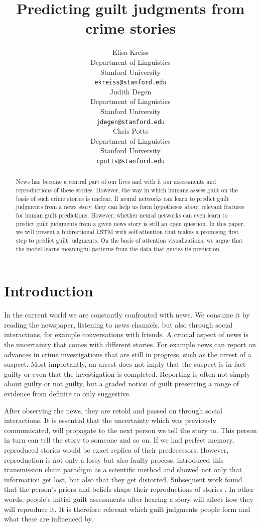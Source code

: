 \documentclass[11pt,a4paper]{article}
\title{Predicting guilt judgments from crime stories}
\author{Elisa Kreiss \\
  Department of Linguistics \\
  Stanford University \\
  \texttt{ekreiss@stanford.edu} \\\And
  Judith Degen \\
  Department of Linguistics \\
  Stanford University \\
  \texttt{jdegen@stanford.edu} \\\And
  Chris Potts \\
  Department of Linguistics \\
  Stanford University \\
  \texttt{cpotts@stanford.edu}\\}
\date{}
\begin{document}
\maketitle
\begin{abstract}
  News has become a central part of our lives and with it our assessments and reproductions of these stories. However, the way in which humans assess guilt on the basis of such crime stories is unclear. If neural networks can learn to predict guilt judgments from a news story, they can help us form hypotheses about relevant features for human guilt predictions. However, whether neural networks can even learn to predict guilt judgments from a given news story is still an open question. In this paper, we will present a bidirectional LSTM with self-attention that makes a promising first step to predict guilt judgments. On the basis of attention visualizations, we argue that the model learns meaningful patterns from the data that guides its prediction.
\end{abstract}

\section{Introduction}

In the current world we are constantly confronted with news. We consume it by reading the newspaper, listening to news channels, but also through social interactions, for example conversations with friends. 
A crucial aspect of news is the uncertainty that comes with different stories. For example news can report on advances in crime investigations that are still in progress, such as the arrest of a suspect. Most importantly, an arrest does not imply that the suspect is in fact guilty or even that the investigation is completed. Reporting is often not simply about guilty or not guilty, but a graded notion of guilt presenting a range of evidence from definite to only suggestive.

After observing the news, they are retold and passed on through social interactions. It is essential that the uncertainty which was previously communicated, will propagate to the next person we tell the story to. This person in turn can tell the story to someone and so on. If we had perfect memory, reproduced stories would be exact replica of their predecessors. However, reproduction is not only a lossy but also faulty process. \cite{Bartlett:1932} introduced this transmission chain paradigm as a scientific method and showed not only that information get lost, but also that they get distorted. Subsequent work found that the person's priors and beliefs shape their reproductions of stories \citep{Allport:1945,Kashima:2000,Griffiths:2007}. In other words, people's initial guilt assessments after hearing a story will affect how they will reproduce it. It is therefore relevant which guilt judgments people form and what these are influenced by.
\end{document}
